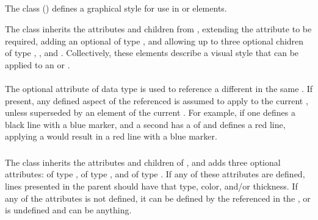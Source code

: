 \begin{blockChanged}
\subsection{}
\label{class:style}

The \Style class () defines a graphical style for use in \Figure or \Plot elements.


The  class inherits the attributes and children from \SedBase, extending the  attribute to be required, adding an optional  of type \SIdRef, and allowing up to three optional chidren of type \Line, \Marker, and \Fill.  Collectively, these elements describe a visual style that can be applied to an \AbstractCurve or \Surface.

\paragraph*{}
The optional  attribute of data type \SIdRef is used to reference a different \Style in the same \SedDocument.  If present, any defined aspect of the referenced \Style is assumed to apply to the current \Style, unless superseded by an element of the current \Style.  For example, if one \Style {} defines a black line with a blue marker, and a second \Style {} has a  of  and defines a red line, applying a  would result in a red line with a blue marker.


\subsubsection{}
\label{class:line}

The \Line class inherits the attributes and children of \SedBase, and adds three optional attributes:  of type \LineType,  of type \SedColor, and  of type .  If any of these attributes are defined, lines presented in the parent \Style should have that type, color, and/or thickness.  If any of the attributes is not defined, it can be defined by the \Style referenced in the , or is undefined and can be anything.


\end{blockChanged}
